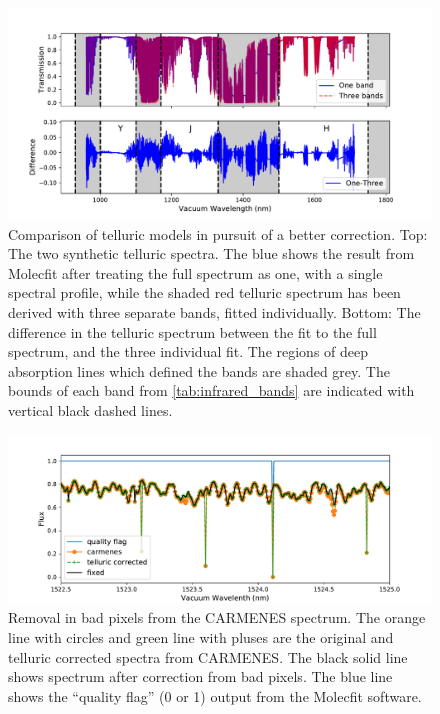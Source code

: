 \begin{figure}
    \centering
    \includegraphics[width=0.9\linewidth]{figures/information-content/Carmenes/compare_telluric_corrections_shaded}
    \caption[]{Comparison of telluric models in pursuit of a better correction.
        Top: The two synthetic telluric spectra.
        The blue shows the result from {Molecfit} after treating the full spectrum as one, with a single spectral profile, while the shaded red telluric spectrum has been derived with three separate bands, fitted individually.
        Bottom: The difference in the telluric spectrum between the fit to the full spectrum, and the three individual fit.
        The regions of deep  absorption lines which defined the \nir{} bands are shaded grey.
        The bounds of each band from \cref{tab:infrared_bands} are indicated with vertical black dashed lines.}
    \label{fig:compare_telluric_corrections}
\end{figure}


\begin{figure}
    \centering
    \includegraphics[width=0.9\linewidth]{figures/information-content/Carmenes/carmenes_spike_removal}
    \caption[Bad pixel removal in {CARMENES}.]{Removal in bad pixels from the {CARMENES} spectrum. The orange line with circles and green line with pluses are the original and telluric corrected spectra from {CARMENES}.
    The black solid line shows spectrum after correction from bad pixels.
    The blue line shows the ``quality flag'' (0 or 1) output from the {Molecfit} software.}
    \label{fig:carmenes_spike_removal}
\end{figure}

